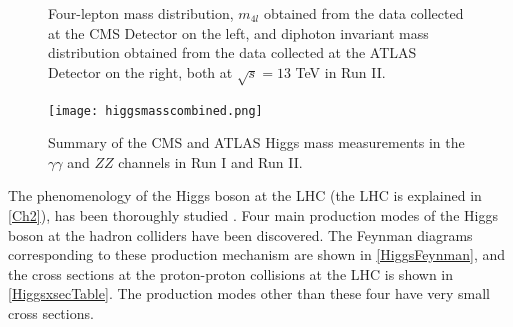 \begin{figure}[ht]
\begin{subfigure}[b]{0.475\textwidth}
            \vspace{-0.5cm}
        \end{subfigure}
        \caption[Four-lepton mass distribution, $m_{4l}$ obtained from the data collected at the CMS Detector on the left, and diphoton invariant mass distribution obtained from the data collected at the ATLAS Detector on the right, both at $\sqrt{s}=13$ TeV in Run II.]
        {\small Four-lepton mass distribution, $m_{4l}$ obtained from the data collected at the CMS Detector\cite{cms-higgs-13tev} on the left, and diphoton invariant mass distribution obtained from the data collected at the ATLAS Detector\cite{atlas-higgs-13tev} on the right, both at $\sqrt{s}=13$ TeV in Run II.} 
        \label{higgs-13tev}
\end{figure}

\begin{figure}[ht]
	\centering
	\texttt{[image: higgsmasscombined.png]}
	\caption[Summary of the CMS and ATLAS Higgs mass measurements in the $\gamma\gamma$ and $ZZ$ channels in Run I and Run II.]{Summary of the CMS and ATLAS Higgs mass measurements in the $\gamma\gamma$ and $ZZ$ channels in Run I and Run II\cite{pdg}.}
	\label{higgsmasssummary}
\end{figure}

The phenomenology of the Higgs boson at the LHC (the LHC is explained in \autoref{Ch2}), has been thoroughly studied \cite{higg-phen-1,higg-phen-2,higg-phen-3}. Four main production modes of the Higgs boson at the hadron colliders have been discovered. The Feynman diagrams corresponding to these production mechanism are shown in \autoref{HiggsFeynman}, and the cross sections at the proton-proton collisions at the LHC is shown in \autoref{HiggsxsecTable}. The production modes other than these four have very small cross sections.

